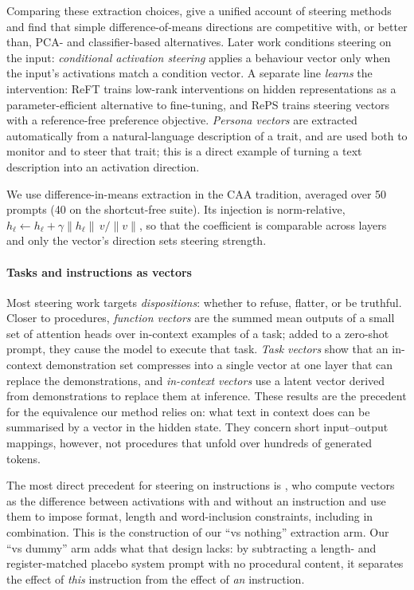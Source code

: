 \documentclass[11pt]{article}
\begin{document}
Comparing these extraction choices, \citet{im2025steering} give a unified account of steering
methods and find that simple difference-of-means directions are competitive with, or better than,
PCA- and classifier-based alternatives. Later work conditions steering on the input:
\emph{conditional activation steering} \citep{lee2025cast} applies a behaviour vector only when the
input's activations match a condition vector. A separate line \emph{learns} the intervention: ReFT
\citep{wu2024reft} trains low-rank interventions on hidden representations as a parameter-efficient
alternative to fine-tuning, and RePS \citep{wu2025reps} trains steering vectors with a
reference-free preference objective. \emph{Persona vectors} \citep{chen2025persona} are extracted
automatically from a natural-language description of a trait, and are used both to monitor and to
steer that trait; this is a direct example of turning a text description into an activation
direction.

We use difference-in-means extraction in the CAA tradition, averaged over 50 prompts (40 on the
shortcut-free suite). Its injection is norm-relative,
$h_\ell \leftarrow h_\ell + \gamma\lVert h_\ell\rVert\, v/\lVert v\rVert$, so that the coefficient is
comparable across layers and only the vector's direction sets steering strength.

\paragraph{Tasks and instructions as vectors} Most steering work targets \emph{dispositions}: whether
to refuse, flatter, or be truthful. Closer to procedures, \emph{function vectors}
\citep{todd2024function} are the summed mean outputs of a small set of attention heads over
in-context examples of a task; added to a zero-shot prompt, they cause the model to execute that
task. \emph{Task vectors} \citep{hendel2023taskvectors} show that an in-context demonstration set
compresses into a single vector at one layer that can replace the demonstrations, and
\emph{in-context vectors} \citep{liu2024icv} use a latent vector derived from demonstrations to
replace them at inference. These results are the precedent for the equivalence our method relies on:
what text in context does can be summarised by a vector in the hidden state. They concern short
input--output mappings, however, not procedures that unfold over hundreds of generated tokens.

The most direct precedent for steering on instructions is \citet{stolfo2025instruction}, who compute
vectors as the difference between activations with and without an instruction and use them to impose
format, length and word-inclusion constraints, including in combination. This is the construction of
our ``vs nothing'' extraction arm. Our ``vs dummy'' arm adds what that design lacks: by subtracting a
length- and register-matched placebo system prompt with no procedural content, it separates the
effect of \emph{this} instruction from the effect of \emph{an} instruction.
\end{document}
